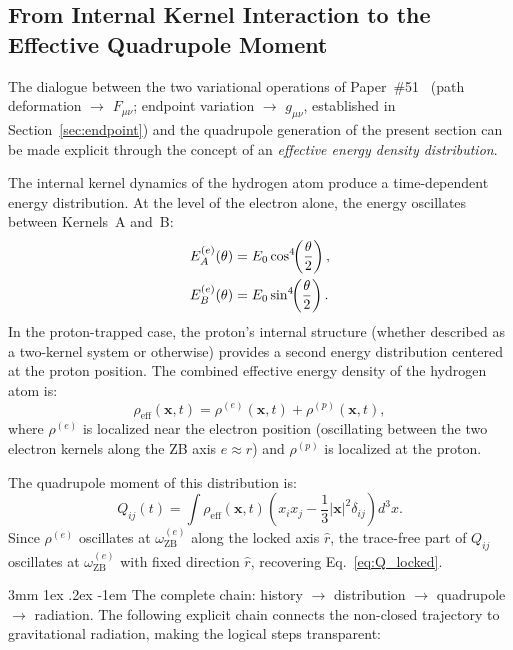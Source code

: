 \documentclass[%
 reprint, amsmath,amssymb, aps, prd, ]{revtex4-2}
\makeatletter
\numberwithin{equation}{section}
\renewcommand\paragraph{%
  \@startsection{paragraph}{4}{\z@}%
    {3mm \@plus 1ex \@minus .2ex}%
    {-1em}%
    {\normalfont\normalsize\itshape}}
\newcommand{\iphase}{\theta}
\newcommand{\omZBe}{\omega_{\mathrm{ZB}}^{(e)}}
\makeatother
\begin{document}
\subsection{From Internal Kernel Interaction to the Effective Quadrupole Moment}

The dialogue between the two variational operations of Paper~\#51~\cite{hanamura51} (path deformation $\to$ $F_{\mu\nu}$; endpoint variation $\to$ $g_{\mu\nu}$, established in Section~\ref{sec:endpoint}) and the quadrupole generation of the present section can be made explicit through the concept of an \emph{effective energy density distribution}.

The internal kernel dynamics of the hydrogen atom produce a time-dependent energy distribution.
At the level of the electron alone, the energy oscillates between Kernels~A and~B:
\begin{align}
E_A^{(e)}(\iphase) &= E_0\cos^4\!\!\left(\frac{\iphase}{2}\right),
\label{eq:EA_EB_e}\\
E_B^{(e)}(\iphase) &= E_0\sin^4\!\!\left(\frac{\iphase}{2}\right).
\notag
\end{align}
In the proton-trapped case, the proton's internal structure (whether described as a two-kernel system or otherwise) provides a second energy distribution centered at the proton position.
The combined effective energy density of the hydrogen atom is:
\begin{equation}
\rho_\mathrm{eff}(\mathbf{x}, t) = \rho^{(e)}(\mathbf{x}, t) + \rho^{(p)}(\mathbf{x}, t),
\label{eq:rho_eff}
\end{equation}
where $\rho^{(e)}$ is localized near the electron position (oscillating between the two electron kernels along the ZB axis $\hat{e} \approx \hat{r}$) and $\rho^{(p)}$ is localized at the proton.

The quadrupole moment of this distribution is:
\begin{equation}
Q_{ij}(t) = \int \rho_\mathrm{eff}(\mathbf{x},t)
\left(x_i x_j - \frac{1}{3}|\mathbf{x}|^2\delta_{ij}\right)d^3x.
\label{eq:Qij_rho}
\end{equation}
Since $\rho^{(e)}$ oscillates at $\omZBe$ along the locked axis $\hat{r}$, the trace-free part of $Q_{ij}$ oscillates at $\omZBe$ with fixed direction $\hat{r}$, recovering Eq.~\eqref{eq:Q_locked}.

\paragraph{The complete chain: history $\to$ distribution $\to$ quadrupole $\to$ radiation.}
The following explicit chain connects the non-closed trajectory to gravitational radiation, making the logical steps transparent:
\end{document}
